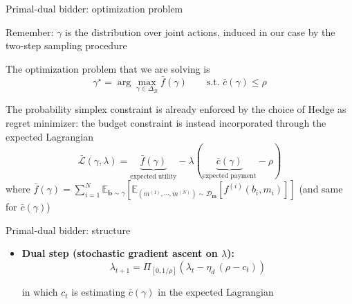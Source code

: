 \begin{frame}{Primal-dual bidder: optimization problem}
    \begin{block}{Remember:}
        $\gamma$ is the distribution over joint actions, induced in our case by the two-step sampling procedure
    \end{block}

    The optimization problem that we are solving is 
    \[\gamma^\star = \arg \max_{\gamma \in \Delta_\mathcal{B}} \bar{f}(\gamma) \qquad \text{s.t.  } \bar{c}(\gamma) \le \rho\]

    The probability simplex constraint is already enforced by the choice of Hedge as regret minimizer: the budget constraint is instead incorporated through the expected Lagrangian
    \[\bar{\mathcal{L}}(\gamma, \lambda) = \underbrace{\bar{f}(\gamma)}_{\text{expected utility}} - \lambda(\underbrace{\bar{c}(\gamma)}_{\text{expected payment}} - \rho)\]
    \vspace{0.2cm}
    where $\bar{f}(\gamma) = \sum_{i=1}^N \mathbb{E}_{\mathbf{b} \sim \gamma}\left[ \mathbb{E}_{(m^{(1)}, \cdots, m^{(N)}) \sim \mathcal{D_\mathbf{m}}}\left[ f^{(i)}(b_i, m_i) \right] \right]$ (and same for $\bar{c}(\gamma)$)
\end{frame}

\begin{frame}{Primal-dual bidder: structure}
    \begin{itemize}
        \item \textbf{Dual step (stochastic gradient ascent on $\lambda$):}
        \[\boxed{\lambda_{t+1} = \Pi_{[0,1/\rho]} \left(\lambda_t - \eta_d\,(\rho - c_t) \right)}\]

        in which $c_t$ is estimating $\bar{c}(\gamma)$ in the expected Lagrangian
    \end{itemize}
\end{frame}

